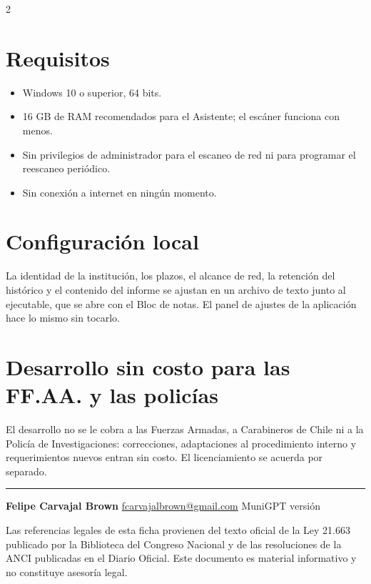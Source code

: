 \documentclass[10pt,a4paper]{article}
\newcommand{\barra}{\textcolor{azul}{\rule{\linewidth}{1.2pt}}}
\begin{document}
\begin{multicols}{2}
\section{Requisitos}
\begin{itemize}
\item Windows 10 o superior, 64 bits.
\item 16 GB de RAM recomendados para el Asistente; el escáner funciona con menos.
\item Sin privilegios de administrador para el escaneo de red ni para programar el
reescaneo periódico.
\item Sin conexión a internet en ningún momento.
\end{itemize}

\section{Configuración local}

La identidad de la institución, los plazos, el alcance de red, la retención del histórico y
el contenido del informe se ajustan en un archivo de texto junto al ejecutable, que se abre
con el Bloc de notas. El panel de ajustes de la aplicación hace lo mismo sin tocarlo.

\section{Desarrollo sin costo para las FF.AA. y las policías}

El desarrollo no se le cobra a las Fuerzas Armadas, a Carabineros de Chile ni a la Policía
de Investigaciones: correcciones, adaptaciones al procedimiento interno y requerimientos
nuevos entran sin costo. El licenciamiento se acuerda por separado.
\end{multicols}

\vspace{4pt}
\barra

\vspace{2pt}

{\footnotesize\color{gris}
\textbf{Felipe Carvajal Brown} \quad\textbullet\quad
\href{mailto:fcarvajalbrown@gmail.com}{fcarvajalbrown@gmail.com} \quad\textbullet\quad
MuniGPT versión \version

\vspace{2pt}
Las referencias legales de esta ficha provienen del texto oficial de la Ley 21.663
publicado por la Biblioteca del Congreso Nacional y de las resoluciones de la ANCI
publicadas en el Diario Oficial. Este documento es material informativo y no constituye
asesoría legal.
}
\end{document}
